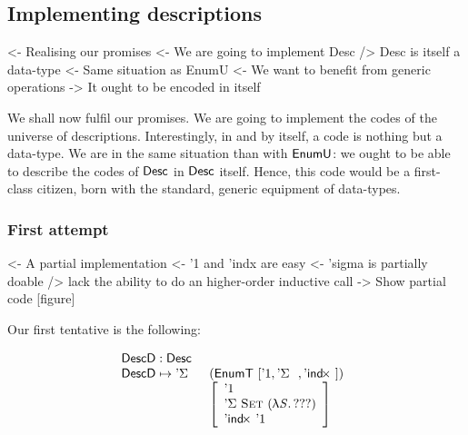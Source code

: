 \subsection{Implementing descriptions}

\begin{wstructure}
<- Realising our promises
    <- We are going to implement Desc
    /> Desc is itself a data-type
        <- Same situation as EnumU
            <- We want to benefit from generic operations
        -> It ought to be encoded in itself
\end{wstructure}

We shall now fulfil our promises. We are going to implement the codes
of the universe of descriptions. Interestingly, in and by itself, a
code is nothing but a data-type. We are in the same situation than
with $\EnumU$: we ought to be able to describe the codes of $\Desc$ in
$\Desc$ itself. Hence, this code would be a first-class citizen, born
with the standard, generic equipment of data-types.

\subsubsection{First attempt}

\begin{wstructure}
<- A partial implementation
    <- '1 and 'indx are easy
    <- 'sigma is partially doable
        /> lack the ability to do an higher-order inductive call
    -> Show partial code [figure]
\end{wstructure}

Our first tentative is the following:

\[\stk{
\DescD : \Desc \\
\begin{array}{@{}ll}
\DescD \mapsto \DSigma{}{} & (\EnumT [ \DUnit, \DSigma{}{}, \DIndx{} ])  \\
                           & \left[\begin{array}{l}
                                   \DUnit                                \\
                                   \DSigma{\Set}{(\LAM{\V{S}} ???)}      \\
                                   \DIndx{\DUnit}                        \\
                                   \end{array}
                             \right]
\end{array}
}\]

